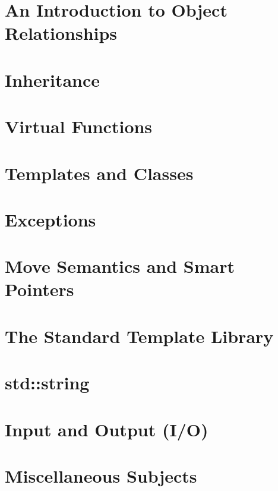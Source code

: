 \documentclass[UTF8]{ctexart}
\begin{document}
\newpage

\section{An Introduction to Object Relationships}

\newpage

\section{Inheritance}

\newpage

\section{Virtual Functions}

\newpage

\section{Templates and Classes}

\newpage

\section{Exceptions}

\newpage

\section{Move Semantics and Smart Pointers}

\newpage

\section{The Standard Template Library}

\newpage

\section{std::string}

\newpage

\section{Input and Output (I/O)}

\newpage

\section{Miscellaneous Subjects}
\end{document}
